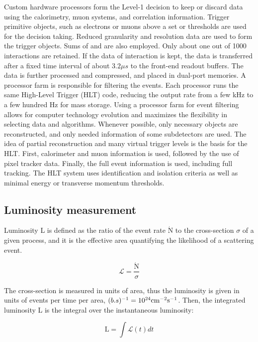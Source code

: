 Custom hardware processors form the Level-1 decision to keep or discard data using the calorimetry, muon systems, and correlation information. Trigger primitive objects, such as electrons or muons above a set \ET or \pt thresholds are used for the decision taking. Reduced granularity and resolution data are used to form the trigger objects. Sums of \ET and \met are also employed. Only about one out of 1000 interactions are retained. If the data of interaction is kept, the data is transferred after a fixed time interval of about $3.2 \mu s$ to the front-end readout buffers. The data is further processed and compressed, and placed in dual-port memories. A processor farm is responsible for filtering the events. Each processor runs the same High-Level Trigger (HLT) code, reducing the output rate from a few kHz to a few hundred Hz for mass storage. Using a processor farm for event filtering allows for computer technology evolution and maximizes the flexibility in selecting data and algorithms. Whenever possible, only necessary objects are reconstructed, and only needed information of some subdetectors are used. The idea of partial reconstruction and many virtual trigger levels is the basis for the HLT. First, calorimeter and muon information is used, followed by the use of pixel tracker data. Finally, the full event information is used, including full tracking. The HLT system uses identification and isolation criteria as well as minimal energy or transverse momentum thresholds.

\subsection{Luminosity measurement}

Luminosity L is defined as the ratio of the event rate $\dot{\mathrm{N}}$ to the cross-section $\sigma$ of a given process, and it is the effective area quantifying the likelihood of a scattering event.

\begin{equation}
  \mathcal{L}=\frac{\dot{\mathrm{N}}}{\sigma}
\end{equation}

The cross-section is measured in units of area, thus the luminosity is given in units of events per time per area, $(b.s)^{-1} = 10^{24} \text{cm}^{-2}\text{s}^{-1}$. Then, the integrated luminosity L is the integral over the instantaneous luminosity:

\begin{equation}
  \mathrm{L}=\int \mathcal{L}(t) d t
\end{equation}


